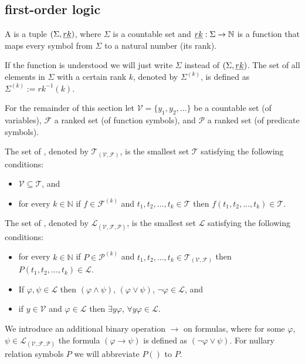 \subsection{first-order logic}
\begin{definition}
	A  is a tuple $(\Sigma,\emph{rk})$, where $\Sigma$ is a countable set and $\emph{rk}:\Sigma\to\mathbb{N}$ is a function that maps every symbol from $\Sigma$ to a natural number (its rank).
\end{definition}
If the function \rank{} is understood we will just write $\Sigma$ instead of $(\Sigma,\emph{rk})$. The set of all elements in $\Sigma$ with a certain rank $k$, denoted by $\Sigma^{(k)}$, is defined as $\Sigma^{(k)}:=rk^{-1}(k)$. 

For the remainder of this section let $\mathcal{V}=\{y_1,y_2,\dots\}$ be a countable set (of variables), $\mathcal{F}$ a ranked set (of function symbols), and $\mathcal{P}$ a ranked set (of predicate symbols).
\begin{definition}
	The set of , denoted by $\mathcal{T}_{(\mathcal{V},\mathcal{F})}$, is the smallest set $\mathcal{T}$ satisfying the following conditions:
	\begin{itemize}
		\item $\mathcal{V} \subseteq \mathcal{T}$, and
		\item for every $k\in\mathbb{N}$ if $f\in\mathcal{F}^{(k)}$ and $t_1,t_2,\dots,t_k\in\mathcal{T}$ then $f(t_1,t_2,\dots,t_k)\in\mathcal{T}$.
	\end{itemize}
	The set of , denoted by $\mathcal{L}_{(\mathcal{V},\mathcal{F},\mathcal{P})}$, is the smallest set $\mathcal{L}$ satisfying the following conditions:
	\begin{itemize}
		\item for every $k\in\mathbb{N}$ if $P\in\mathcal{P}^{(k)}$ and $t_1,t_2,\dots,t_k\in\mathcal{T}_{(\mathcal{V},\mathcal{F})}$ then $P(t_1,t_2,\dots,t_k)\in\mathcal{L}$.
		\item If $\varphi,\psi\in\mathcal{L}$ then $(\varphi\wedge\psi)$, $(\varphi\vee\psi)$, $\neg \varphi\in\mathcal{L}$, and
		\item if $y\in\mathcal{V}$ and $\varphi\in\mathcal{L}$ then $\exists y\varphi$, $\forall y\varphi\in\mathcal{L}$. %
	\end{itemize}
\end{definition}
We introduce an additional binary operation $\to$ on formulas, where for some $\varphi$, $\psi\in\mathcal{L}_{(\mathcal{V},\mathcal{F},\mathcal{P})}$ the formula $(\varphi\to\psi)$ is defined as $(\neg\varphi\vee\psi)$. For nullary relation symbols $P$ we will abbreviate $P()$ to $P$. 

